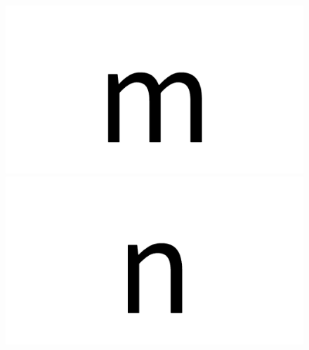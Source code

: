 \documentclass{article}
\begin{document}
\begin{figure}[H]
  \includegraphics[width=\linewidth]{m}
\endminipage\hfill
{}
  \includegraphics[width=\linewidth]{n}
\endminipage\hfill
\end{figure}
\end{document}
